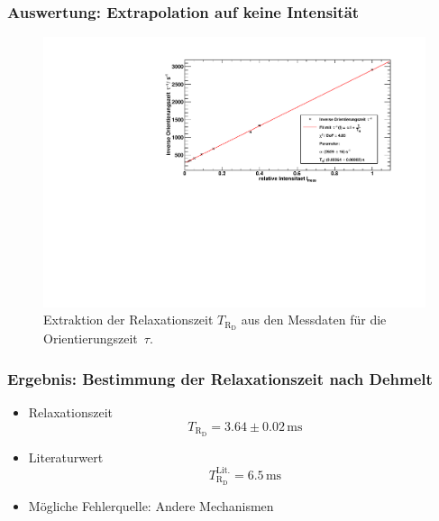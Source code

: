 \begin{frame}
\frametitle{Auswertung: Extrapolation auf keine Intensität}
\begin{figure}
    \begin{center}
        \includegraphics[width=\textwidth]{../img/taufit.pdf}
        \caption{Extraktion der Relaxationszeit $T_{\text{R}_\text{D}}$ aus den Messdaten für die Orientierungszeit~$\tau$.}
    \end{center}
\end{figure}
\end{frame}

\begin{frame}
\frametitle{Ergebnis: Bestimmung der Relaxationszeit nach Dehmelt}
\begin{itemize}[<+->]
    \item Relaxationszeit
    \begin{equation*}
        T_{\text{R}_\text{D}} = 3.64 \pm 0.02\,\text{ms}
    \end{equation*}
    \item Literaturwert
    \begin{equation*}
        T_{\text{R}_\text{D}}^\text{Lit.} = 6.5\,\text{ms}
    \end{equation*}
    \item Mögliche Fehlerquelle: Andere Mechanismen
\end{itemize}
\end{frame}
